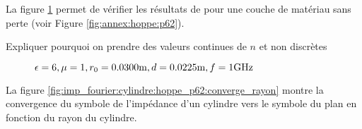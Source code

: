     La figure \ref{fig:imp_fourier:cylindre:hoppe_p62} permet de vérifier les résultats de \cite[p.~62]{hoppe_impedance_1995} pour une couche de matériau sans perte (voir Figure \ref{fig:annex:hoppe:p62}).

    \begin{TODO}
      Expliquer pourquoi on prendre des valeurs continues de \(n\) et non discrètes
    \end{TODO}

    \begin{figure}[!hbt]
      \centering
      \caption{\(\epsilon = 6, \mu = 1, r_0 = 0.0300\text{m}, d=0.0225\text{m}, f=1\text{GHz}\)}
      \label{fig:imp_fourier:cylindre:hoppe_p62}
    \end{figure}

    La figure \ref{fig:imp_fourier:cylindre:hoppe_p62:converge_rayon} montre la convergence du symbole de l'impédance d'un cylindre vers le symbole du plan en fonction du rayon du cylindre.

